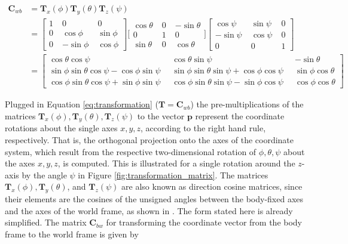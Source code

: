 \begin{equation}\label{eq:transformation_matrices}
\begin{split}
\mathbf{C}_{wb} & = \mathbf{T}_x(\phi) \mathbf{T}_y(\theta) \mathbf{T}_z(\psi) \\
 & = {\left[ \begin{smallmatrix}
    1 \; & 0 \; & 0 \\
    0 \; & \cos \phi \; & \sin \phi \\
    0 \; & -\sin \phi \; & \cos \phi
    \end{smallmatrix}\right]}
    {\bigg[ \begin{smallmatrix}
    \cos \theta \; & 0 \; & -\sin \theta \\
    0 \; & 1 \; & 0 \\
    \sin \theta \; & 0 \; & \cos \theta
    \end{smallmatrix} \bigg]}
    {\left[\begin{smallmatrix}
    \cos \psi \; & \sin \psi \; & 0 \\
    -\sin \psi \; & \cos \psi \; & 0 \\
    0 \; & 0 \; & 1
    \end{smallmatrix}\right]}\\
 & = {\left[\begin{smallmatrix}
   \cos \theta \cos \psi \; &
    \cos \theta \sin \psi \; &
   -\sin \theta \\
    \sin \phi \sin \theta \cos \psi - \cos \phi \sin \psi \;\; &
    \sin \phi \sin \theta \sin \psi + \cos \phi \cos \psi \;\; &
    \sin \phi \cos \theta \\
    \cos \phi \sin \theta \cos \psi + \sin \phi \sin \psi \;\; &
    \cos \phi \sin \theta \sin \psi - \sin \phi \cos \psi \;\; &
    \cos \phi \cos \theta
  \end{smallmatrix}\right]}
\end{split}
\end{equation}

\noindent
Plugged in Equation \ref{eq:transformation} ($\mathbf{T} = \mathbf{C}_{wb}$) the pre-multiplications of the matrices $\mathbf{T}_x(\phi), \mathbf{T}_y(\theta), \mathbf{T}_z(\psi)$ to the vector $\mathbf{p}$ represent the coordinate rotations about the single axes $x, y, z$, according to the right hand rule, respectively. That is, the orthogonal projection onto the axes of the coordinate system, which result from the respective two-dimensional rotation of $\phi, \theta, \psi$ about the axes $x, y, z$, is computed. This is illustrated for a single rotation around the $z$-axis by the angle $\psi$ in Figure \ref{fig:transformation_matrix}. The matrices $\mathbf{T}_x(\phi), \mathbf{T}_y(\theta)$, and $\mathbf{T}_z(\psi)$ are also known as direction cosine matrices, since their elements are the cosines of the unsigned angles between the body-fixed axes and the axes of the world frame, as shown in \cite{diebel2006attitude}. The form stated here is already simplified. The matrix $\mathbf{C}_{bw}$ for transforming the coordinate vector from the body frame to the world frame is given by

